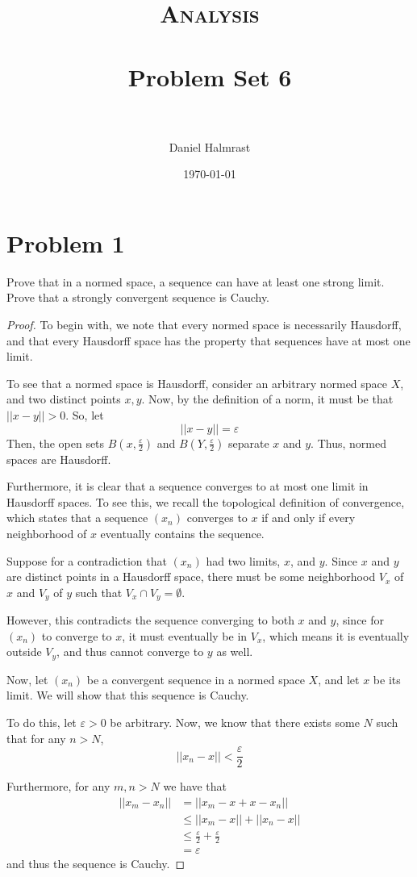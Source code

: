 \documentclass[fontsize=11pt]{scrartcl} %
\title{	
\normalfont \normalsize 
\textsc{Analysis} \\ [25pt] %
\horrule{0.5pt} \\[0.4cm] %
\huge Problem Set 6\\ %
\horrule{2pt} \\[0.5cm] %
}
\author{Daniel Halmrast} %
\date{\normalsize\today} %
\numberwithin{equation}{section} %
\numberwithin{figure}{section} %
\numberwithin{table}{section} %
\begin{document}
\maketitle %

\section*{Problem 1}
Prove that in a normed space, a sequence can have at least one strong limit.
Prove that a strongly convergent sequence is Cauchy.
\\
\begin{proof}
    To begin with, we note that every normed space is necessarily Hausdorff,
    and that every Hausdorff space has the property that sequences have at most
    one limit. 

    To see that a normed space is Hausdorff, consider an arbitrary normed space
    $X$, and two distinct points $x,y$. Now, by the definition of a norm, it
    must be that $||x-y||>0$. So, let
    \[
        ||x-y||=\varepsilon
    \]
    Then, the open sets $B(x,\frac{\varepsilon}{2})$ and
    $B(Y,\frac{\varepsilon}{2})$ separate $x$ and $y$. Thus, normed spaces are
    Hausdorff.

    Furthermore, it is clear that a sequence converges to at most one limit in
    Hausdorff spaces. To see this, we recall the topological definition of
    convergence, which states that a sequence $(x_n)$ converges to $x$ if and
    only if every neighborhood of $x$ eventually contains the sequence.

    Suppose for a contradiction that $(x_n)$ had two limits, $x$, and $y$.
    Since $x$ and $y$ are distinct points in a Hausdorff space, there must be
    some neighborhood $V_x$ of $x$ and $V_y$ of $y$ such that $V_x\cap
    V_y=\emptyset$.

    However, this contradicts the sequence converging to both $x$ and $y$, since
    for $(x_n)$ to converge to $x$, it must eventually be in $V_x$, which means
    it is eventually outside $V_y$, and thus cannot converge to $y$ as well.

    Now, let $(x_n)$ be a convergent sequence in a normed space $X$, and let $x$
    be its limit. We will show that this sequence is Cauchy.

    To do this, let $\varepsilon>0$ be arbitrary. Now, we know that there exists
    some $N$ such that for any $n>N$,
    \[
        ||x_n - x||<\frac{\varepsilon}{2}
    \]
    
    Furthermore, for any $m,n>N$ we have that
    \[
        \begin{aligned}
            ||x_m-x_n|| &= ||x_m-x+x-x_n||\\
                        &\leq ||x_m-x|| + ||x_n-x||\\
                        &\leq \frac{\varepsilon}{2}+\frac{\varepsilon}{2}\\
                        &=\varepsilon
        \end{aligned}
    \]
    and thus the sequence is Cauchy.
\end{proof}
\end{document}
